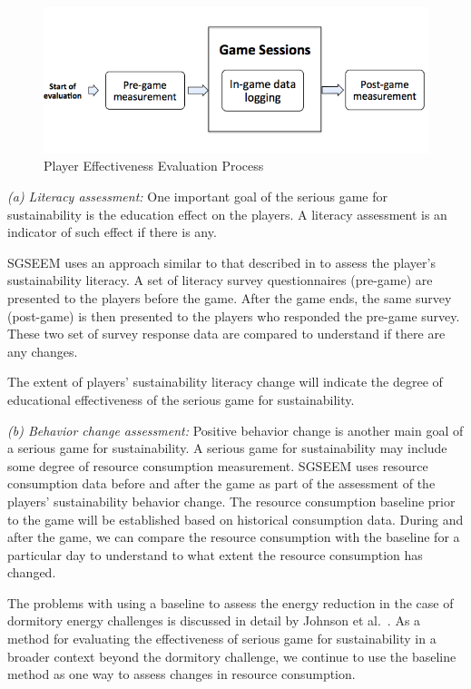 \documentclass{sigchi}
\begin{document}
\begin{figure}
  \center
  \includegraphics[width=\columnwidth]{pre-post-eval}
  \caption{Player Effectiveness Evaluation Process}
  \label{fig:pre-post-eval}
\end{figure}

\emph {(a) Literacy assessment:} One important goal of the serious
game for sustainability is the education effect on the
players. A literacy assessment is an indicator of such effect if there
is any.

SGSEEM uses an approach similar to that described in \cite{csdl2-10-08} to
assess the player's sustainability literacy. A set of literacy survey
questionnaires (pre-game) are presented to the players 
before the game. After the game ends, the same survey
(post-game) is then presented to the players who responded the
pre-game survey. These two set of survey response data are
compared to understand if there are any changes.

The extent of players' sustainability literacy change will indicate
the degree of educational effectiveness of the serious game for
sustainability.

\emph {(b) Behavior change assessment:} Positive behavior change is
another main goal of a serious game for sustainability. A serious game
for sustainability may include some degree of resource
consumption measurement. SGSEEM uses resource consumption data before and
after the game as part of the assessment of the
players' sustainability behavior change.  The resource consumption
baseline prior to the game will be established based on historical
consumption data. During and after the game, we can compare the
resource consumption with the baseline for a particular day to
understand to what extent the resource consumption has changed.

The problems with using a baseline to assess the energy reduction in
the case of dormitory energy challenges is discussed in detail by Johnson et al.~\cite{csdl2-12-08}. As a method for evaluating the
effectiveness of serious game for sustainability in a broader context
beyond the dormitory challenge, we continue to use the baseline
method as one way to assess changes in resource consumption.
\end{document}

